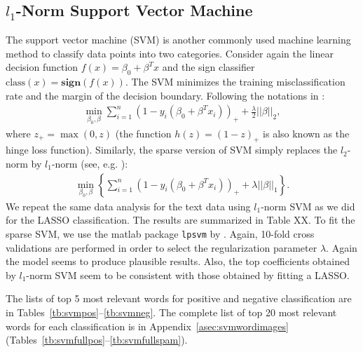 \documentclass[11pt]{article}
\newcommand{\note}[1]{{\em \color{red} #1}}
\newcommand{\1}[1]{{\mathbf 1}\left\{#1\right\}}        %
\begin{document}
\subsection{$l_1$-Norm Support Vector Machine}

The support vector machine (SVM) is another commonly used machine learning method to classify data points into two categories. Consider again the linear decision function $f(x) = \beta_0 + \beta^T x$ and the sign classifier $\text{class}(x) = \textbf{sign} (f(x))$. The SVM minimizes the training misclassification rate and the margin of the decision boundary. Following the notations in \cite{hastie2004entire}:
\begin{align}
\label{eq:l2svm}
\min_{\beta_0,\beta} \sum_{i=1}^n(1-y_i(\beta_0+\beta^Tx_i))_+ + \frac{\lambda}{2} ||\beta||_2,
\end{align}
where $z_+ = \max(0,z)$ (the function $h(z) = (1-z)_+$ is also known as the hinge loss function). Similarly, the sparse version of SVM simply replaces the $l_2$-norm by $l_1$-norm (see, e.g. \cite{zhu20041}):
\begin{align*}
\label{eq:l1svm}
\min_{\beta_0,\beta} \left\{ \sum_{i=1}^n(1-y_i(\beta_0+\beta^Tx_i))_+ + \lambda ||\beta||_1\right\}. 
\end{align*}
We repeat the same data analysis for the text data using $l_1$-norm SVM as we did for the LASSO classification. The results are summarized in Table XX. To fit the sparse SVM, we use the matlab package {\tt lpsvm} by \cite{fung2004feature}. Again, 10-fold cross validations are performed in order to select the regularization parameter $\lambda$. Again the model seems to produce plausible results. Also, the top coefficients obtained by $l_1$-norm SVM seem to be consistent with those obtained by fitting a LASSO.  
%

The lists of top 5 most relevant words for positive and negative classification are in Tables~\ref{tb:svmpos}--\ref{tb:svmneg}.
The complete list of top 20 most relevant words for each classification is in Appendix~\ref{asec:svmwordimages} (Tables~\ref{tb:svmfullpos}--\ref{tb:svmfullspam}).
\end{document}
